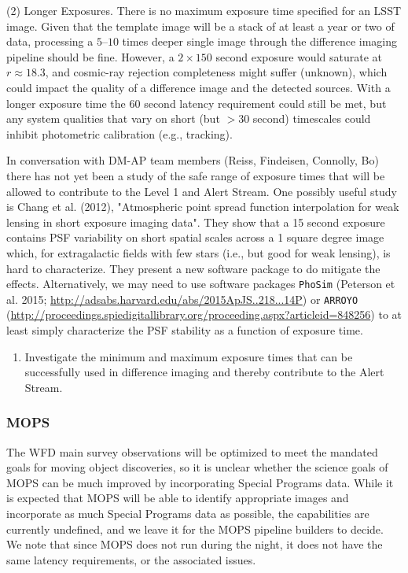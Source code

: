 \documentclass[DM,lsstdraft,toc]{lsstdoc}
\begin{document}
(2) Longer Exposures. There is no maximum exposure time specified for an LSST image. Given that the template image will be a stack of at least a year or two of data, processing a $5$--$10$ times deeper single image through the difference imaging pipeline should be fine. However, a $2\times150$ second exposure would saturate at $r \approx 18.3$, and cosmic-ray rejection completeness might suffer (unknown), which could impact the quality of a difference image and the detected sources. With a longer exposure time the $60$ second latency requirement could still be met, but any system qualities that vary on short (but $>30$ second) timescales could inhibit photometric calibration (e.g., tracking). 

In conversation with DM-AP team members (Reiss, Findeisen, Connolly, Bo) there has not yet been a study of the safe range of exposure times that will be allowed to contribute to the Level 1 and Alert Stream. One possibly useful study is Chang et al. (2012), "Atmospheric point spread function interpolation for weak lensing in short exposure imaging data". They show that a 15 second exposure contains PSF variability on short spatial scales across a 1 square degree image which, for extragalactic fields with few stars (i.e., but good for weak lensing), is hard to characterize. They present a new software package to do mitigate the effects. Alternatively, we may need to use software packages {\tt PhoSim} (Peterson et al. 2015; \url{http://adsabs.harvard.edu/abs/2015ApJS..218...14P}) or {\tt ARROYO} (\url{http://proceedings.spiedigitallibrary.org/proceeding.aspx?articleid=848256}) to at least simply characterize the PSF stability as a function of exposure time.

\begin{enumerate}[topsep=-10pt,label= \textbf{Concern \Roman*.}] \item \label{C1} Investigate the minimum and maximum exposure times that can be successfully used in difference imaging and thereby contribute to the Alert Stream. \end{enumerate}

\subsubsection{MOPS}\label{ssec:dmdocs_SPinWFD_MOPS}

The WFD main survey observations will be optimized to meet the mandated goals for moving object discoveries, so it is unclear whether the science goals of MOPS can be much improved by incorporating Special Programs data. While it is expected that MOPS will be able to identify appropriate images and incorporate as much Special Programs data as possible, the capabilities are currently undefined, and we leave it for the MOPS pipeline builders to decide. We note that since MOPS does not run during the night, it does not have the same latency requirements, or the associated issues.
\end{document}
